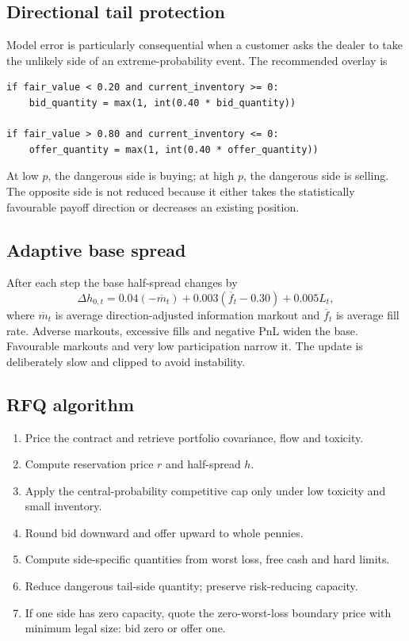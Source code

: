 \documentclass[10pt,a4paper]{article}
\newcommand{\1}{\mathbf{1}}
\begin{document}
\subsection{Directional tail protection}
Model error is particularly consequential when a customer asks the dealer to take the
unlikely side of an extreme-probability event.  The recommended overlay is
\begin{lstlisting}
if fair_value < 0.20 and current_inventory >= 0:
    bid_quantity = max(1, int(0.40 * bid_quantity))

if fair_value > 0.80 and current_inventory <= 0:
    offer_quantity = max(1, int(0.40 * offer_quantity))
\end{lstlisting}
At low $p$, the dangerous side is buying; at high $p$, the dangerous side is selling.
The opposite side is not reduced because it either takes the statistically favourable
payoff direction or decreases an existing position.

\subsection{Adaptive base spread}
After each step the base half-spread changes by
\[
 \Delta h_{0,t}=0.04(-\overline m_t)
 +0.003(\overline f_t-0.30)+0.005L_t,
\]
where $\overline m_t$ is average direction-adjusted information markout and
$\overline f_t$ is average fill rate.  Adverse markouts, excessive fills and negative
PnL widen the base.  Favourable markouts and very low participation narrow it.  The
update is deliberately slow and clipped to avoid instability.

\subsection{RFQ algorithm}
\begin{enumerate}
  \item Price the contract and retrieve portfolio covariance, flow and toxicity.
  \item Compute reservation price $r$ and half-spread $h$.
  \item Apply the central-probability competitive cap only under low toxicity and
  small inventory.
  \item Round bid downward and offer upward to whole pennies.
  \item Compute side-specific quantities from worst loss, free cash and hard limits.
  \item Reduce dangerous tail-side quantity; preserve risk-reducing capacity.
  \item If one side has zero capacity, quote the zero-worst-loss boundary price with
  minimum legal size: bid zero or offer one.
\end{enumerate}
\end{document}
